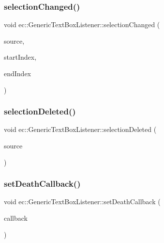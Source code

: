 \subsubsection{\texorpdfstring{selection\+Changed()}{selectionChanged()}}
{\footnotesize\ttfamily void ec\+::\+Generic\+Text\+Box\+Listener\+::selection\+Changed (\begin{DoxyParamCaption}\item[{agui\+::\+Text\+Box $\ast$}]{source,  }\item[{int}]{start\+Index,  }\item[{int}]{end\+Index }\end{DoxyParamCaption})\hspace{0.3cm}{\ttfamily [override]}}

\mbox{\label{classec_1_1_generic_text_box_listener_a5f1b7490ad657f39a2a1d6270446482e}} 
\subsubsection{\texorpdfstring{selection\+Deleted()}{selectionDeleted()}}
{\footnotesize\ttfamily void ec\+::\+Generic\+Text\+Box\+Listener\+::selection\+Deleted (\begin{DoxyParamCaption}\item[{agui\+::\+Text\+Box $\ast$}]{source }\end{DoxyParamCaption})\hspace{0.3cm}{\ttfamily [override]}}

\mbox{\label{classec_1_1_generic_text_box_listener_a8a807340857e0d0ab13aa8b0ddfb29b1}} 
\subsubsection{\texorpdfstring{set\+Death\+Callback()}{setDeathCallback()}}
{\footnotesize\ttfamily void ec\+::\+Generic\+Text\+Box\+Listener\+::set\+Death\+Callback (\begin{DoxyParamCaption}\item[{const \mbox{\hyperlink{classec_1_1_generic_text_box_listener_acef5d6f448ba7f8a90e56deed9e4be68}{Death\+\_\+\+Callback}} \&}]{callback }\end{DoxyParamCaption})}

